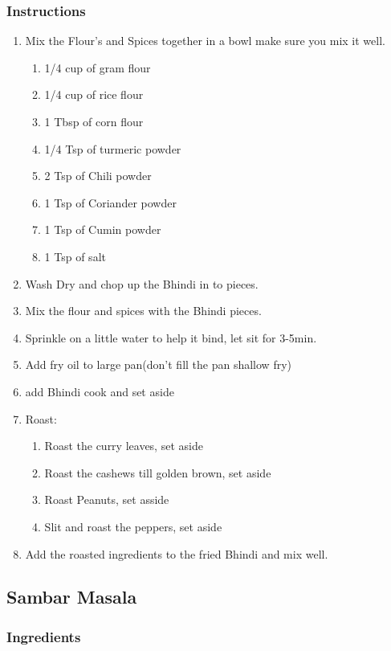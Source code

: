 \documentclass[11pt]{article}
\begin{document}
\subsubsection*{Instructions}
\label{sec:org14d0a40}
\begin{enumerate}
\item Mix the Flour's and Spices together in a bowl make sure you mix it well.
\begin{enumerate}
\item 1/4 cup of gram flour
\item 1/4 cup of rice flour
\item 1 Tbsp of corn flour
\item 1/4 Tsp of turmeric powder
\item 2 Tsp of Chili powder
\item 1 Tsp of Coriander powder
\item 1 Tsp of Cumin powder
\item 1 Tsp of salt
\end{enumerate}
\item Wash Dry and chop up the Bhindi in to pieces.
\item Mix the flour and spices with the Bhindi pieces.
\item Sprinkle on a little water to help it bind, let sit for 3-5min.
\item Add fry oil to large pan(don't fill the pan shallow fry)
\item add Bhindi cook and set aside
\item Roast:
\begin{enumerate}
\item Roast the curry leaves, set aside
\item Roast the cashews till golden brown, set aside
\item Roast Peanuts, set asside
\item Slit and roast the peppers, set aside
\end{enumerate}
\item Add the roasted ingredients to the fried Bhindi and mix well.
\end{enumerate}
\subsection{Sambar Masala}
\label{sec:orgfd5b9a7}
\subsubsection*{Ingredients}
\label{sec:org6438676}
\end{document}
